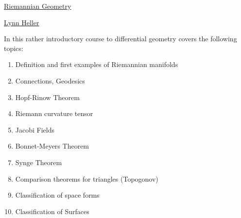 \documentclass[11pt]{article}
\begin{document}
	\kaishu 
	\setcounter{section}{0}
	\begin{center}
		{\LARGE  \href{https://bimsa.net/activity/riemannian/}{Riemannian Geometry}}
		
		
		{\large \href{https://bimsa.net/people/lynnheller/}{Lynn Heller}}
	\end{center}
\setcounter{page}{1}




In this rather introductory course to differential geometry covers the following topics:

\vspace{-0.25cm}

\begin{enumerate}
	\item Definition and first examples of Riemannian manifolds
	\item Connections, Geodesics
	\item Hopf-Rinow Theorem
	\item Riemann curvature tensor
	\item Jacobi Fields
	\item Bonnet-Meyers Theorem
	\item Synge Theorem
	\item Comparison theorems for triangles (Topogonov)
	\item Classification of space forms
	\item Classification of Surfaces
\end{enumerate}

\vspace{0.25cm}
\end{document}
